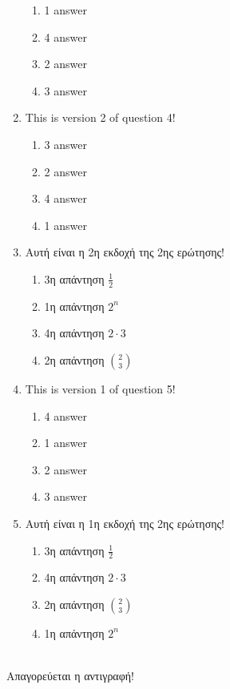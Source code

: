 \documentclass[a4paper, 11pt]{article}
\begin{document}
\begin{enumerate}
\begin{enumerate}[(1)]
    \item 1 answer
    \item 4 answer
    \item 2 answer
    \item 3 answer
\end{enumerate}
\item This is version 2 of question 4!
\begin{enumerate}[(1)]
    \item 3 answer
    \item 2 answer
    \item 4 answer
    \item 1 answer
\end{enumerate}
\item Αυτή είναι η 2η εκδοχή της 2ης ερώτησης!
\begin{enumerate}[(1)]
    \item 3η απάντηση $\frac{1}{2}$
    \item 1η απάντηση $2^n$
    \item 4η απάντηση $2\cdot 3$
    \item 2η απάντηση $\binom{2}{3}$
\end{enumerate}
\item This is version 1 of question 5!
\begin{enumerate}[(1)]
    \item 4 answer
    \item 1 answer
    \item 2 answer
    \item 3 answer
\end{enumerate}
\item Αυτή είναι η 1η εκδοχή της 2ης ερώτησης!
\begin{enumerate}[(1)]
    \item 3η απάντηση $\frac{1}{2}$
    \item 4η απάντηση $2\cdot 3$
    \item 2η απάντηση $\binom{2}{3}$
    \item 1η απάντηση $2^n$
\end{enumerate}
\end{enumerate}
\hrulefill \\ 

Απαγορεύεται η αντιγραφή! 

\newpage 
\end{document}
